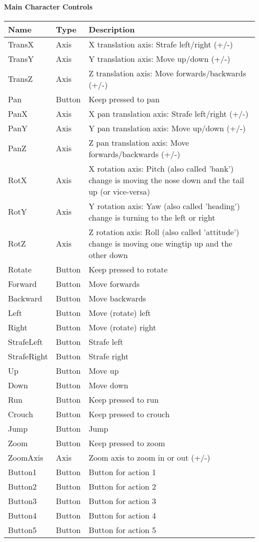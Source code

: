 \paragraph{Main Character Controls}
\begin{center}
	\centering
	\begin{longtable}{ | l | l | p{9cm} |}
	\hline
	Name		&	Type	&	Description \\ \hline
	TransX		&	Axis	&	X translation axis: Strafe left/right (+/-)\\
	TransY		&	Axis	&	Y translation axis: Move up/down (+/-)\\
	TransZ		&	Axis	&	Z translation axis: Move forwards/backwards (+/-)\\
	Pan			&	Button	&	Keep pressed to pan\\
	PanX		&	Axis	&	X pan translation axis: Strafe left/right (+/-)\\
	PanY		&	Axis	&	Y pan translation axis: Move up/down (+/-)\\
	PanZ		&	Axis	&	Z pan translation axis: Move forwards/backwards (+/-)\\
	RotX		&	Axis	&	X rotation axis: Pitch (also called 'bank') change is moving the nose down and the tail up (or vice-versa)\\
	RotY		&	Axis	&	Y rotation axis: Yaw (also called 'heading') change is turning to the left or right\\
	RotZ		&	Axis	&	Z rotation axis: Roll (also called 'attitude') change is moving one wingtip up and the other down\\
	Rotate		&	Button	&	Keep pressed to rotate\\
	Forward		&	Button	&	Move forwards\\
	Backward	&	Button	&	Move backwards\\
	Left		&	Button	&	Move (rotate) left\\
	Right		&	Button	&	Move (rotate) right\\
	StrafeLeft	&	Button	&	Strafe left\\
	StrafeRight	&	Button	&	Strafe right\\
	Up			&	Button	&	Move up\\
	Down		&	Button	&	Move down\\
	Run			&	Button	&	Keep pressed to run\\
	Crouch		&	Button	&	Keep pressed to crouch\\
	Jump		&	Button	&	Jump\\
	Zoom		&	Button	&	Keep pressed to zoom\\
	ZoomAxis	&	Axis	&	Zoom axis to zoom in or out (+/-)\\
	Button1		&	Button	&	Button for action 1\\
	Button2		&	Button	&	Button for action 2\\
	Button3		&	Button	&	Button for action 3\\
	Button4		&	Button	&	Button for action 4\\
	Button5		&	Button	&	Button for action 5\\
	\hline
	\end{longtable}
\end{center}


